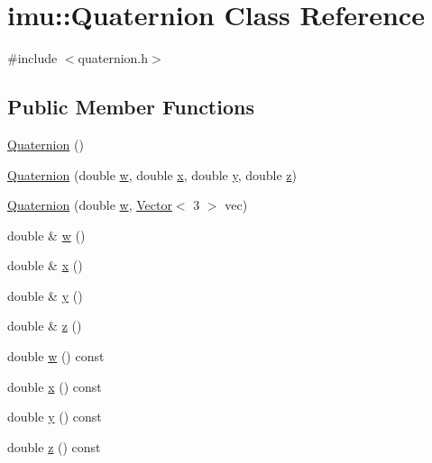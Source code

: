 \hypertarget{classimu_1_1Quaternion}{}\section{imu\+:\+:Quaternion Class Reference}
\label{classimu_1_1Quaternion}


{\ttfamily \#include $<$quaternion.\+h$>$}

\subsection*{Public Member Functions}
\begin{DoxyCompactItemize}
\item 
\hyperlink{classimu_1_1Quaternion_a621ed3a7619d16099641706ff82aef38}{Quaternion} ()
\item 
\hyperlink{classimu_1_1Quaternion_a003a0efa788e9d4ee7814fd7a152fc8f}{Quaternion} (double \hyperlink{classimu_1_1Quaternion_aaf087d68164a6e97598c73d545c7d479}{w}, double \hyperlink{classimu_1_1Quaternion_a9010516ed6fe5ac48514bda65108e992}{x}, double \hyperlink{classimu_1_1Quaternion_a816b96eec90bf82054b557b59be4239b}{y}, double \hyperlink{classimu_1_1Quaternion_a0030b111234c17de120384b10eb2cf9b}{z})
\item 
\hyperlink{classimu_1_1Quaternion_a09308874d4d7b73014d395d65cdbf698}{Quaternion} (double \hyperlink{classimu_1_1Quaternion_aaf087d68164a6e97598c73d545c7d479}{w}, \hyperlink{classimu_1_1Vector}{Vector}$<$ 3 $>$ vec)
\item 
double \& \hyperlink{classimu_1_1Quaternion_aaf087d68164a6e97598c73d545c7d479}{w} ()
\item 
double \& \hyperlink{classimu_1_1Quaternion_a9010516ed6fe5ac48514bda65108e992}{x} ()
\item 
double \& \hyperlink{classimu_1_1Quaternion_a816b96eec90bf82054b557b59be4239b}{y} ()
\item 
double \& \hyperlink{classimu_1_1Quaternion_a0030b111234c17de120384b10eb2cf9b}{z} ()
\item 
double \hyperlink{classimu_1_1Quaternion_aa3ee0c5f8c229592699d2e15946f58a8}{w} () const 
\item 
double \hyperlink{classimu_1_1Quaternion_ab218997be5ead948c45a86a224f4d02b}{x} () const 
\item 
double \hyperlink{classimu_1_1Quaternion_a01592b460d13edde874608f9086f67d8}{y} () const 
\item 
double \hyperlink{classimu_1_1Quaternion_a1b7f8baa094911973486ba0995efcaed}{z} () const 

\end{DoxyCompactItemize}
